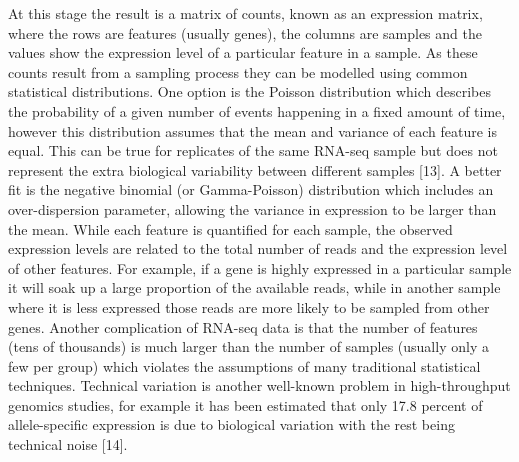 \documentclass[11pt,a4paper,titlepage,twoside,openright]{style/unimelbthesis}
\theoremstyle{definition}
\theoremstyle{definition}
\theoremstyle{definition}
\theoremstyle{remark}
\begin{document}
\begin{mainmatter}
At this stage the result is a matrix of counts, known as an expression matrix, where the rows are features (usually genes), the columns are samples and the values show the expression level of a particular feature in a sample. As these counts result from a sampling process they can be modelled using common statistical distributions. One option is the Poisson distribution which describes the probability of a given number of events happening in a fixed amount of time, however this distribution assumes that the mean and variance of each feature is equal. This can be true for replicates of the same RNA-seq sample but does not represent the extra biological variability between different samples {[}13{]}. A better fit is the negative binomial (or Gamma-Poisson) distribution which includes an over-dispersion parameter, allowing the variance in expression to be larger than the mean. While each feature is quantified for each sample, the observed expression levels are related to the total number of reads and the expression level of other features. For example, if a gene is highly expressed in a particular sample it will soak up a large proportion of the available reads, while in another sample where it is less expressed those reads are more likely to be sampled from other genes. Another complication of RNA-seq data is that the number of features (tens of thousands) is much larger than the number of samples (usually only a few per group) which violates the assumptions of many traditional statistical techniques. Technical variation is another well-known problem in high-throughput genomics studies, for example it has been estimated that only 17.8 percent of allele-specific expression is due to biological variation with the rest being technical noise {[}14{]}.


\end{mainmatter}
\end{document}
